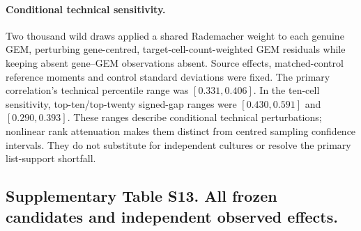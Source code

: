 \documentclass[a4paper,fleqn]{cas-sc}
\makeatletter
\DeclareRobustCommand{\rev}[1]{{\color{red}\def\@citecolor{black}\def\@linkcolor{red}\def\@urlcolor{red}#1}}
\makeatother
\begin{document}
\paragraph{\rev{Conditional technical sensitivity.}}
\rev{Two thousand wild draws applied a shared Rademacher weight to each genuine GEM, perturbing gene-centred, target-cell-count-weighted GEM residuals while keeping absent gene--GEM observations absent.} \rev{Source effects, matched-control reference moments and control standard deviations were fixed.} \rev{The primary correlation's technical percentile range was $[0.331,0.406]$.} \rev{In the ten-cell sensitivity, top-ten/top-twenty signed-gap ranges were $[0.430,0.591]$ and $[0.290,0.393]$.} \rev{These ranges describe conditional technical perturbations; nonlinear rank attenuation makes them distinct from centred sampling confidence intervals.} \rev{They do not substitute for independent cultures or resolve the primary list-support shortfall.}

\subsection*{\rev{Supplementary Table S13. All frozen candidates and independent observed effects.}}
\end{document}

